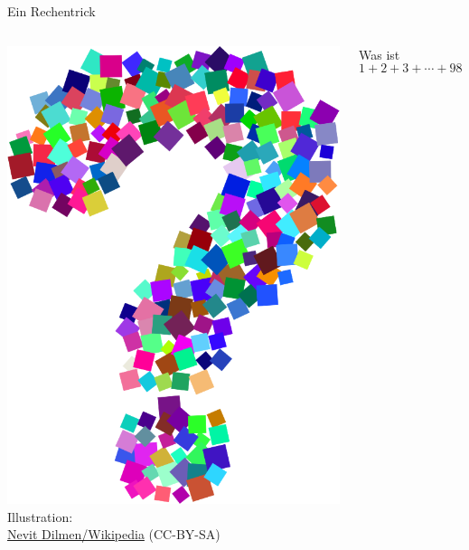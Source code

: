 \documentclass[12pt,compress,ngerman,utf8,t]{beamer}
\newcommand{\withsource}[2]{\begin{center}#1\\\tiny #2\end{center}}
\begin{document}
\begin{frame}{Ein Rechentrick}
  \vspace*{-1em}
  \begin{columns}[c]
    \begin{column}{0.2\textwidth}
      \withsource{
        \includegraphics[width=\textwidth]{question-mark}
      }{
        Illustration: \\
        \href{https://commons.wikimedia.org/wiki/File:Question_mark_1.svg}{Nevit
        Dilmen/Wikipedia} (CC-BY-SA)
      }
    \end{column}

    \begin{column}{0.7\textwidth}
      \large\centering
      Was ist{\quad}
      \[ 1 + 2 + 3 + \cdots + 98 + 99 + 100? \]
    \end{column}
  \end{columns}

  \pause


\end{frame}
\end{document}
